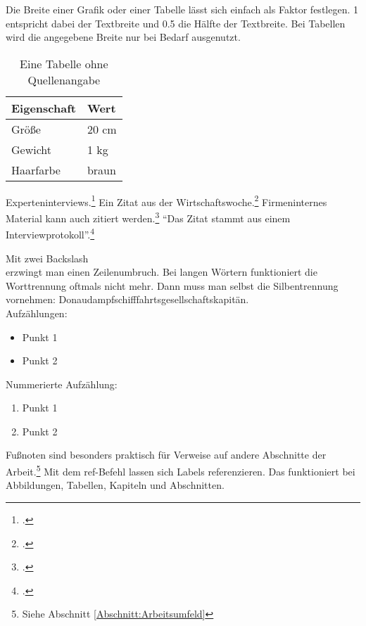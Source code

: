 Die Breite einer Grafik oder einer Tabelle lässt sich einfach als Faktor festlegen. 1 entspricht dabei der Textbreite und 0.5 die Hälfte der Textbreite.
Bei Tabellen wird die angegebene Breite nur bei Bedarf ausgenutzt.

\begin{table}[H]
  \centering
  \begin{tabulary}{0.7\textwidth}{|L|L|}
  \hline 
  Eigenschaft & Wert \\ 
  \hline 
  Größe & 20 cm \\ 
  \hline 
  Gewicht & 1 kg \\
  \hline
  Haarfarbe & braun \\  
  \hline 
  \end{tabulary} 
  \caption[Eine Tabelle ohne Quellenangabe]{Eine Tabelle ohne Quellenangabe}
\end{table}


Experteninterviews.\footcite[Vgl.][S. 7]{Meuser2009} Ein Zitat aus der Wirtschaftswoche.\footcite[Vgl.][S. 32]{WIWO2018}
Firmeninternes Material kann auch zitiert werden.\footcite[Vgl.][]{Firma2018} "`Das Zitat stammt aus einem Interviewprotokoll"'.\footcite{Experte2018}

Mit zwei Backslash \\ erzwingt man einen Zeilenumbruch. Bei langen Wörtern funktioniert die Worttrennung oftmals nicht mehr.
Dann muss man selbst die Silbentrennung vornehmen: Donau\-dampf\-schiff\-fahrts\-gesell\-schafts\-kapitän. \\
Aufzählungen:
\begin{itemize}
  \item Punkt 1
  \item Punkt 2
\end{itemize}
Nummerierte Aufzählung:
\begin{enumerate}
  \item Punkt 1
  \item Punkt 2
\end{enumerate}

Fußnoten sind besonders praktisch für Verweise auf andere Abschnitte der Arbeit.\footnote{Siehe Abschnitt \ref{Abschnitt:Arbeitsumfeld}} 
Mit dem ref-Befehl lassen sich Labels referenzieren. Das funktioniert bei Abbildungen, Tabellen, Kapiteln und Abschnitten.